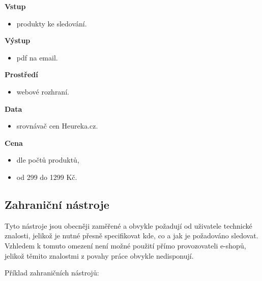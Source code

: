\documentclass[thesis=B,czech]{FITthesis}[2012/06/26]
\begin{document}
\textbf{Vstup}
\begin{itemize}
\item produkty ke sledování.
\end{itemize}

\textbf{Výstup}
\begin{itemize}
\item pdf na email.
\end{itemize}

\textbf{Prostředí}
\begin{itemize}
\item webové rozhraní.
\end{itemize}

\textbf{Data}
\begin{itemize}
\item srovnávač cen Heureka.cz.
\end{itemize}

\textbf{Cena}
\begin{itemize}
\item dle počtů produktů,
\item od 299 do 1299 Kč.
\end{itemize}

\newpage

\subsection{Zahraniční nástroje}
Tyto nástroje jsou obecněji zaměřené a obvykle požadují od uživatele technické znalosti, 
jelikož je nutné přesně specifikovat kde, co a jak je požadováno sledovat. Vzhledem k tomuto omezení není možné
použití přímo provozovateli e-shopů, jelikož těmito znalostmi z povahy práce obvykle nedisponují.
\par
Příklad zahraničních nástrojů:
\end{document}
